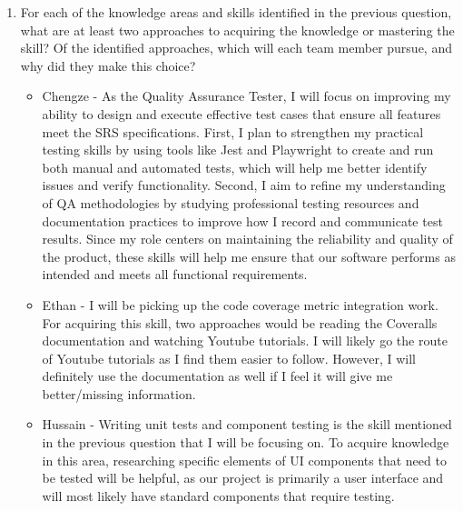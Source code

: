 \documentclass[12pt, titlepage]{article}
\begin{document}
\begin{enumerate}
    Generally, the team will need to collectively learn more about and improve
    test writing skills. This includes writing better software that is
    testable, which has not always been a focus in our course work. Developing
    the habit of writing tests to cover the code you write is important and
    will be new for some of us.

    As mentioned, validation is not as much of a concern for this project.

  \item For each of the knowledge areas and skills identified in the previous
  question, what are at least two approaches to acquiring the knowledge or
  mastering the skill?  Of the identified approaches, which will each team
  member pursue, and why did they make this choice?
  \begin{itemize}
    \item Chengze - As the Quality Assurance Tester, I will focus on improving my
    ability to design and execute effective test cases that ensure all features
    meet the SRS specifications. First, I plan to strengthen my practical testing
    skills by using tools like Jest and Playwright to create and run both manual
    and automated tests, which will help me better identify issues and verify functionality.
    Second, I aim to refine my understanding of QA methodologies by studying professional
    testing resources and documentation practices to improve how I record and communicate
    test results. Since my role centers on maintaining the reliability and quality of the
    product, these skills will help me ensure that our software performs as intended and
    meets all functional requirements.
    \item Ethan - I will be picking up the code coverage metric integration
      work. For acquiring this skill, two approaches would be reading the
      Coveralls documentation and watching Youtube tutorials. I will likely go
      the route of Youtube tutorials as I find them easier to follow. However,
      I will definitely use the documentation as well if I feel it will give me
      better/missing information.
    \item Hussain - Writing unit tests and component testing is the skill
    mentioned in the previous question that I will be focusing on. To acquire
    knowledge in this area, researching specific elements of UI components that
    need to be tested will be helpful, as our project is primarily a user
    interface and will most likely have standard components that require testing.

\end{itemize}
\end{enumerate}
\end{document}
